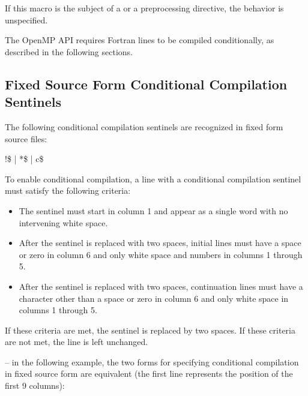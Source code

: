 If this macro is the subject of a  or a  preprocessing directive, the 
behavior is unspecified.

\fortranspecificstart
The OpenMP API requires Fortran lines to be compiled conditionally, as described in 
the following sections.








\subsection{Fixed Source Form Conditional Compilation Sentinels}
\label{subsec:Fixed Source Form Conditional Compilation Sentinels}
The following conditional compilation sentinels are recognized in fixed form source 
files:

\begin{boxedcode}
!\$ \textnormal{|} *\$ \textnormal{|} c\$
\end{boxedcode}

To enable conditional compilation, a line with a conditional compilation sentinel must 
satisfy the following criteria: 

\begin{itemize}
\item The sentinel must start in column 1 and appear as a single word with no intervening 
white space. 

\item After the sentinel is replaced with two spaces, initial lines must have a space or zero 
in column 6 and only white space and numbers in columns 1 through 5.

\item After the sentinel is replaced with two spaces, continuation lines must have a 
character other than a space or zero in column 6 and only white space in columns 1 
through 5.
\end{itemize}

If these criteria are met, the sentinel is replaced by two spaces. If these criteria are not 
met, the line is left unchanged.

\notestart
\noteheader – in the following example, the two forms for specifying conditional compilation 
in fixed source form are equivalent (the first line represents the position of the first 9 
columns):

\begin{alltt}
\end{alltt}
\noteend



